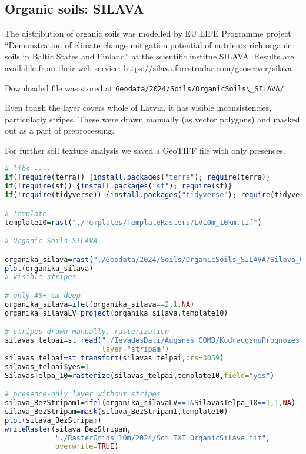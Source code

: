 \documentclass[
]{book}
\newcommand{\passthrough}[1]{#1}
\begin{document}
\subsection{Organic soils: SILAVA}\label{Ch04.07.05}

The distribution of organic soils was modelled by EU LIFE Programme project
``Demonstration of climate change mitigation potential of nutrients rich organic
soils in Baltic States and Finland'' at the scientific institue SILAVA. Results are
available from their web service: \url{https://silava.forestradar.com/geoserver/silava}

Downloaded file was stored at \passthrough{\lstinline!Geodata/2024/Soils/OrganicSoils\_SILAVA/!}.

Even tough the layer covers whole of Latvia, it has visible inconsistencies,
particularly stripes. These were drawn manually (as vector polygons) and masked
out as a part of preprocessing.

For further soil texture analysis we saved a GeoTIFF file with only presences.

\begin{lstlisting}[language=R]
# libs ----
if(!require(terra)) {install.packages("terra"); require(terra)}
if(!require(sf)) {install.packages("sf"); require(sf)}
if(!require(tidyverse)) {install.packages("tidyverse"); require(tidyverse)}

# Template ----
template10=rast("./Templates/TemplateRasters/LV10m_10km.tif")

# Organic Soils SILAVA ----

organika_silava=rast("./Geodata/2024/Soils/OrganicSoils_SILAVA/Silava_OrgSoils.tif")
plot(organika_silava)
# visible stripes

# only 40+ cm deep
organika_silava=ifel(organika_silava==2,1,NA)
organika_silavaLV=project(organika_silava,template10)

# stripes drawn manually, rasterization
silavas_telpai=st_read("./IevadesDati/Augsnes_COMB/KudraugsnuPrognozes_Silava/stripam.gpkg",
                       layer="stripam")
silavas_telpai=st_transform(silavas_telpai,crs=3059)
silavas_telpai$yes=1
SilavasTelpa_10=rasterize(silavas_telpai,template10,field="yes")

# presence-only layer without stripes
silava_BezStripam1=ifel(organika_silavaLV==1&SilavasTelpa_10==1,1,NA)
silava_BezStripam=mask(silava_BezStripam1,template10)
plot(silava_BezStripam)
writeRaster(silava_BezStripam,
            "./RasterGrids_10m/2024/SoilTXT_OrganicSilava.tif",
            overwrite=TRUE)
\end{lstlisting}
\end{document}
